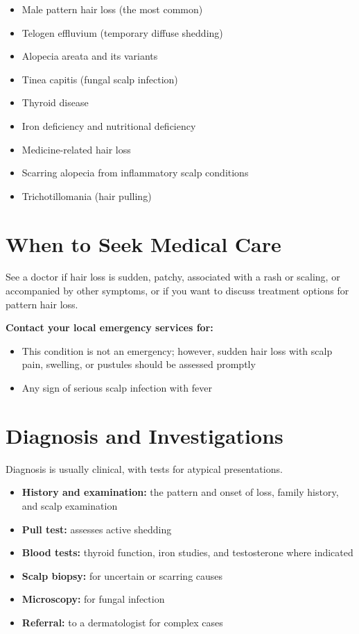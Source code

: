 \begin{itemize}
    \item Male pattern hair loss (the most common)
    \item Telogen effluvium (temporary diffuse shedding)
    \item Alopecia areata and its variants
    \item Tinea capitis (fungal scalp infection)
    \item Thyroid disease
    \item Iron deficiency and nutritional deficiency
    \item Medicine-related hair loss
    \item Scarring alopecia from inflammatory scalp conditions
    \item Trichotillomania (hair pulling)
\end{itemize}

\section*{When to Seek Medical Care}
See a doctor if hair loss is sudden, patchy, associated with a rash or scaling, or accompanied by other symptoms, or if you want to discuss treatment options for pattern hair loss.

\textbf{Contact your local emergency services for:}
\begin{itemize}
    \item This condition is not an emergency; however, sudden hair loss with scalp pain, swelling, or pustules should be assessed promptly
    \item Any sign of serious scalp infection with fever
\end{itemize}

\section*{Diagnosis and Investigations}
Diagnosis is usually clinical, with tests for atypical presentations.

\begin{itemize}
    \item \textbf{History and examination:} the pattern and onset of loss, family history, and scalp examination
    \item \textbf{Pull test:} assesses active shedding
    \item \textbf{Blood tests:} thyroid function, iron studies, and testosterone where indicated
    \item \textbf{Scalp biopsy:} for uncertain or scarring causes
    \item \textbf{Microscopy:} for fungal infection
    \item \textbf{Referral:} to a dermatologist for complex cases
\end{itemize}


